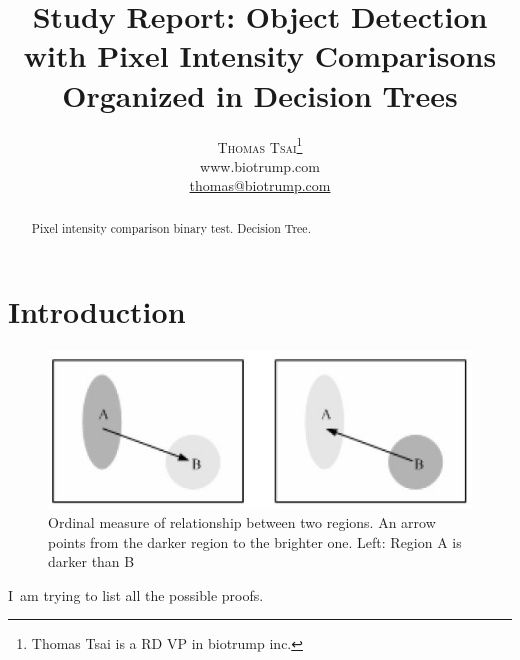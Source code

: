 \documentclass[a4paper,12pt]{article}
\title{\vspace{-15mm}\fontsize{24pt}{10pt}\selectfont\textbf{Study Report: Object Detection with Pixel Intensity Comparisons Organized in Decision Trees}} %
\author{
\large
\textsc{Thomas Tsai}\thanks{Thomas Tsai is a RD VP in biotrump inc.}\\[2mm] %
\normalsize www.biotrump.com \\ %
\normalsize \href{mailto:thomas@biotrump.com}{thomas@biotrump.com} %
\vspace{-5mm}
}
\date{}
\begin{document}
\maketitle %



\begin{abstract}

Pixel intensity comparison binary test. \cite{DBLP:journals/corr/abs-1305-4537} Decision Tree.

\end{abstract}



\section{Introduction}

\begin{figure}[ht]
  \centering
  \includegraphics[width=\textwidth, keepaspectratio=true]{pair-wise-ordinal.jpg}
  \caption{Ordinal measure of relationship between two regions. 
  An arrow points from the darker region to the brighter one. Left: Region A is darker than B}
 \label{fig:pair-wise-ordinal}
\end{figure}


\lettrine[nindent=0em,lines=3]{I}\ am trying to list all the possible proofs.
\end{document}
